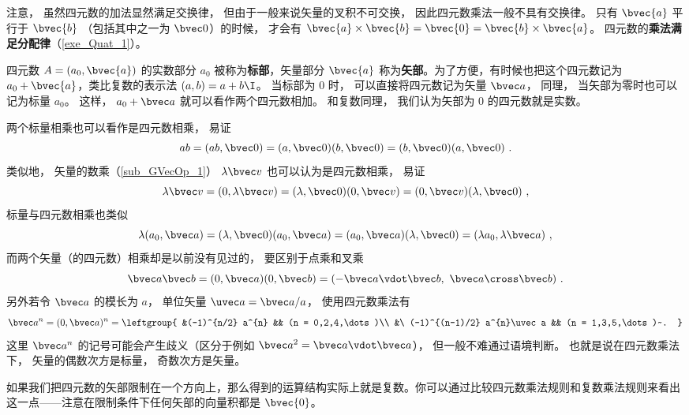 注意， 虽然四元数的加法显然满足交换律， 但由于一般来说矢量的叉积不可交换， 因此四元数乘法一般不具有交换律。 只有 $\bvec{a}$ 平行于 $\bvec{b}$ （包括其中之一为 $\bvec 0$）的时候， 才会有 $\bvec{a}\times\bvec{b}= \bvec{0} =\bvec{b}\times\bvec{a}$。 四元数的\textbf{乘法满足分配律}（\autoref{exe_Quat_1}）。

四元数 $A=(a_0, \bvec{a})$ 的实数部分 $a_0$ 被称为\textbf{标部}，矢量部分 $\bvec{a}$ 称为\textbf{矢部}。为了方便，有时候也把这个四元数记为 $a_0+\bvec{a}$，类比复数的表示法 $(a, b)=a+b\I$。 当标部为 $0$ 时， 可以直接将四元数记为矢量 $\bvec a$， 同理， 当矢部为零时也可以记为标量 $a_0$。 这样， $a_0 + \bvec a$ 就可以看作两个四元数相加。 和复数同理， 我们认为矢部为 $0$ 的四元数就是实数。

\begin{example}{}
两个标量相乘也可以看作是四元数相乘， 易证
\begin{equation}
ab = (ab, \bvec 0) = (a,\bvec 0)(b,\bvec 0) = (b,\bvec 0)(a,\bvec 0)~.
\end{equation}
类似地， 矢量的数乘（\autoref{sub_GVecOp_1}） $\lambda\bvec v$ 也可以认为是四元数相乘， 易证
\begin{equation}
\lambda\bvec v = (0, \lambda\bvec v) = (\lambda, \bvec 0)(0, \bvec v) = (0, \bvec v)(\lambda, \bvec 0)~,
\end{equation}
标量与四元数相乘也类似
\begin{equation}
\lambda (a_0, \bvec a) = (\lambda,\bvec 0) (a_0, \bvec a) = (a_0, \bvec a)(\lambda,\bvec 0) = (\lambda a_0, \lambda\bvec a)~,
\end{equation}
而两个矢量（的四元数）相乘却是以前没有见过的， 要区别于点乘和叉乘
\begin{equation}
\bvec a\bvec b = (0, \bvec a)(0, \bvec b) = (-\bvec a\vdot\bvec b,\ \bvec a\cross\bvec b)~.
\end{equation}
另外若令 $\bvec a$ 的模长为 $a$， 单位矢量 $\uvec a = \bvec a/a$， 使用四元数乘法有
\begin{equation}
\bvec a^{n} = (0, \bvec a)^{n} =
\leftgroup{
&(-1)^{n/2} a^{n} && (n = 0,2,4,\dots)\\
&\ (-1)^{(n-1)/2} a^{n}\uvec a && (n = 1,3,5,\dots)~.
}
\end{equation}
这里 $\bvec a^{n}$ 的记号可能会产生歧义（区分于例如 $\bvec a^2 = \bvec a\vdot\bvec a$）， 但一般不难通过语境判断。 也就是说在四元数乘法下， 矢量的偶数次方是标量， 奇数次方是矢量。
\end{example}

如果我们把四元数的矢部限制在一个方向上，那么得到的运算结构实际上就是复数。你可以通过比较四元数乘法规则和复数乘法规则来看出这一点——注意在限制条件下任何矢部的向量积都是 $\bvec{0}$。

